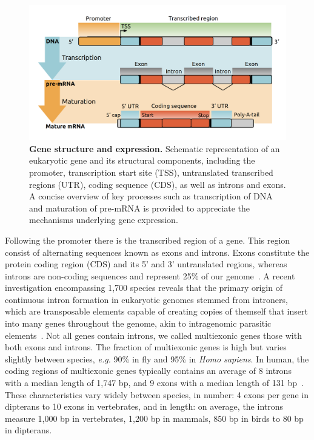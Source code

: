 \begin{figure}[ht]
    \centering
    \includegraphics[width=\linewidth]{figures/gene_structure.png}
    \caption[Gene structure and expression]{\textbf{Gene structure and expression.} Schematic representation of an eukaryotic gene and its structural components, including the promoter, transcription start site (\acrshort{TSS}), untranslated transcribed regions (\acrshort{UTR}), coding sequence (\acrshort{CDS}), as well as introns and exons. A concise overview of key processes such as transcription of DNA and maturation of pre-\acrshort{mRNA} is provided to appreciate the mechanisms underlying gene expression.\newline}
    \label{fig:genestructure}
\end{figure}

Following the promoter there is the transcribed region of a gene. This region consist of alternating sequences known as exons and introns. Exons constitute the protein coding region (\acrshort{CDS}) and its 5' and 3' untranslated regions, whereas introns are non-coding sequences and represent 25\% of our genome~\citep{sakharkar_distributions_2004}. A recent investigation encompassing 1,700 species reveals that the primary origin of continuous intron formation in eukaryotic genomes stemmed from introners, which are transposable elements capable of creating copies of themself that insert into many genes throughout the genome, akin to intragenomic parasitic elements~\citep{gozashti_transposable_2022}. Not all genes contain introns, we called multiexonic genes those with both exons and introns. The fraction of multiexonic genes is high but varies slightly between species, \textit{e.g.} 90\% in fly and 95\% in \textit{Homo sapiens}. In human, the coding regions of multiexonic genes typically contains an average of 8 introns with a median length of 1,747 \acrshort{bp}, and 9 exons with a median length of 131 \acrshort{bp}~\citep{piovesan_human_2019}. These characteristics vary widely between species, in number: 4 exons per gene in dipterans to 10 exons in vertebrates, and in length: on average, the introns measure 1,000 \acrshort{bp} in vertebrates, 1,200 \acrshort{bp} in mammals, 850 \acrshort{bp} in birds to 80 \acrshort{bp} in dipterans.

